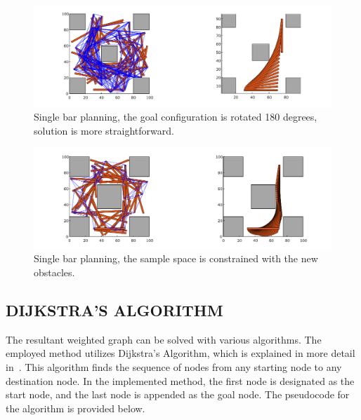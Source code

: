 \documentclass{IEEEtaes}
\begin{document}
\begin{figure}[t]
    \begin{center}
        \includegraphics[width=1\linewidth]{figures/EXP1-2.pdf}
     \end{center}
     \vspace{-1em}
     \caption{Single bar planning, the goal configuration is rotated 180 degrees, solution is more straightforward.}
     \label{bar-2}
     \vspace{-1em}
\end{figure}

\begin{figure}[t]
    \begin{center}
        \includegraphics[width=1\linewidth]{figures/EXP1-3.pdf}
     \end{center}
     \vspace{-1em}
     \caption{Single bar planning, the sample space is constrained with the new obstacles.}
     \label{bar-3}
     \vspace{-1em}
\end{figure}

\subsection{\fontsize{10}{13}\selectfont DIJKSTRA'S ALGORITHM}
The resultant weighted graph can be solved with various algorithms. The employed method utilizes Dijkstra's Algorithm, which is explained in more detail in~\cite{dijkstra}. This algorithm finds the sequence of nodes from any starting node to any destination node. In the implemented method, the first node is designated as the start node, and the last node is appended as the goal node. The pseudocode for the algorithm is provided below.
\end{document}
